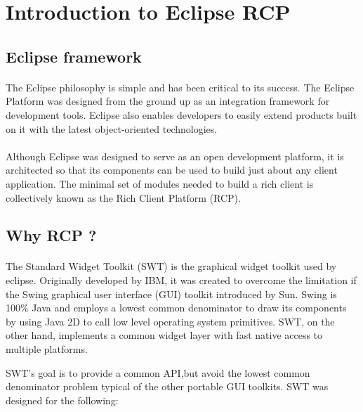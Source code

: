 \section{Introduction to Eclipse RCP}
\subsection{Eclipse framework}

\paragraph{}
The Eclipse philosophy is simple and has been critical to its success. The Eclipse Platform was designed from the ground up as an integration framework for development tools. Eclipse also enables developers to easily extend products built on it with the latest object-oriented technologies.

\paragraph{}
Although Eclipse was designed to serve as an open development platform, it is architected so that its components can be used to build just about any client application. The minimal set of modules needed to build a rich client is collectively known as the Rich Client Platform (RCP).

\subsection{Why RCP ?}

\paragraph{}
The Standard Widget Toolkit (SWT) is the graphical widget toolkit used by eclipse. Originally developed by IBM, it was created to overcome the limitation if the Swing graphical user interface (GUI) toolkit introduced by Sun. Swing is 100\% Java and employs a lowest common denominator to draw its components by using Java 2D to call low level operating system primitives. SWT, on the other hand, implements a common widget layer with fast native access to multiple platforms.

SWT's goal is to provide a common API,but avoid the lowest common denominator problem typical of the other portable GUI toolkits. SWT was designed for the following: 

